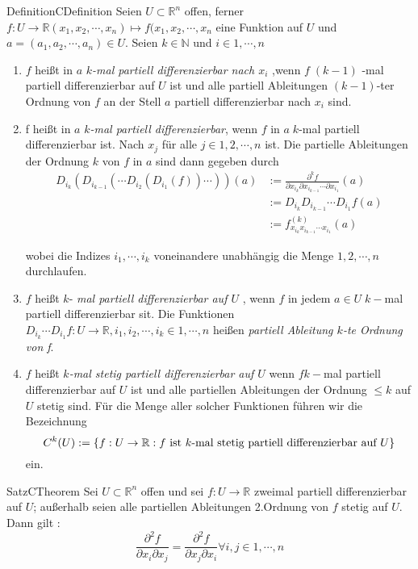 \begin{ibox}[]{Definition}{CDefinition}
	Seien $ U \subset \mathbb{R}^n  $ offen, ferner 
	$ f:U \to \mathbb{R}  (x_1,x_2,\cdots,x_{n}) \mapsto f(x_1,x_2, \cdots, x_{n} $
	eine Funktion auf $ U $ und $ a = (a_1,a_2, \cdots, a_{n}) \in U $. Seien $ k \in \mathbb{N}  $ und $ i \in {1,\cdots,n }$
	\begin{enumerate}[label=\alph*)]
		\item $ f $ heißt in $ a $ \textit{ $ k $-mal partiell differenzierbar nach $ x_i $  },wenn $ f \; (k-1) $ -mal partiell
			differenzierbar auf $ U $ ist und alle partiell Ableitungen $ (k-1) $-ter Ordnung von $ f $ an der Stell $ a $ partiell
			differenzierbar nach $ x_i $ sind.
		\item f heißt in $ a $ \textit{$ k $-mal partiell differenzierbar}, wenn $ f $ in $ a \; k$-mal partiell differenzierbar ist.
			Nach $ x_j $ für alle $ j \in  {1,2, \cdots, n} $ ist. Die partielle Ableitungen der Ordnung $ k $ von $ f $ in $ a $ 
			sind dann gegeben durch 
			\begin{align*}
				D_{i_k}\left( D_{i_{k-1}} \left( \cdots D_{i_2} \left( D_{i_1} (f) \right) \cdots \right)  \right)(a) &:= 
			\frac{\partial^{k} f}{\partial x_{i_{k}} \partial x_{i_{k-1}} \cdots \partial x_{i_1}} (a) \\
			&:= D_{i_{k}} D_{i_{k-1}} \cdots D_{i_1} f(a) \\
			&:= f_{x_{i_{k}} x_{i_{k-1}} \cdots x_{i_1}}^{\left( k \right) } (a)
			\end{align*}
			
			 wobei die Indizes $ i_{1}, \cdots, i_{k} $ voneinandere unabhängig die Menge $ {1,2,\cdots,n}  $ durchlaufen. 
		\item $ f $ heißt $ k $- \textit{mal partiell differenzierbar auf $ U $ }, wenn $ f $ in jedem $ a \in U \; k-$mal partiell
			differenzierbar sit. Die Funktionen $ D_{i_{k}} \cdots D_{i_1} f:U \to \mathbb{R} , i_1,i_2, \cdots, i_{k} \in{1,\cdots,n}$
			heißen \textit{partiell Ableitung $ k $-te Ordnung von f}.
		\item $ f $ heißt \textit{$ k $-mal stetig partiell differenzierbar auf $ U $ } wenn $ f k- $mal partiell differenzierbar auf 
			$ U $ ist und alle partiellen Ableitungen der Ordnung $ \leq  k $ auf $ U $ stetig sind. Für die Menge aller solcher 
			Funktionen führen wir die Bezeichnung 
			$$ C^{k}(U) : = \{f: U \to \mathbb{R} : f \text{ ist $ k $-mal stetig partiell differenzierbar auf } U \} $$ ein.
	\end{enumerate}
\end{ibox}
\begin{ibox}[29]{Satz}{CTheorem}
    Sei $ U \subset  \mathbb{R}^n  $ offen und sei $ f: U \to \mathbb{R}  $ zweimal partiell differenzierbar auf $ U $; außerhalb 
	seien alle partiellen Ableitungen 2.Ordnung von $ f $ stetig auf $ U $. Dann gilt :
	$$ \frac{\partial^{2} f }{\partial x_{i}  \partial x_{j} } =  \frac{\partial^{2} f }{\partial x_{j}  \partial x_{i} } 
	\forall  i,j \in {1,\cdots, n} $$
\end{ibox}

